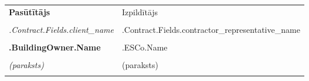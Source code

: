 
\mbox{}\vfill %
\begin{tabu}{X X} \tabucline{}
	\rowfont[c]\bfseries Pasūtītājs & Izpildītājs \\
	[10pt]\makebox[8cm]{\hrulefill} & \makebox[8cm]{\hrulefill} \\
	\rowfont[c]\itshape {{.Contract.Fields.client_name}} & {{.Contract.Fields.contractor_representative_name}} \\
	[10pt]\makebox[8cm]{\hrulefill} & \makebox[8cm]{\hrulefill} \\
	\rowfont[c]\bfseries {{.BuildingOwner.Name}} & {{.ESCo.Name}} \\
	[10pt]\makebox[8cm]{\hrulefill} & \makebox[8cm]{\hrulefill} \\
	\rowfont[c]\itshape (paraksts) & (paraksts) \\[4cm] \\
\end{tabu}
\pagebreak
